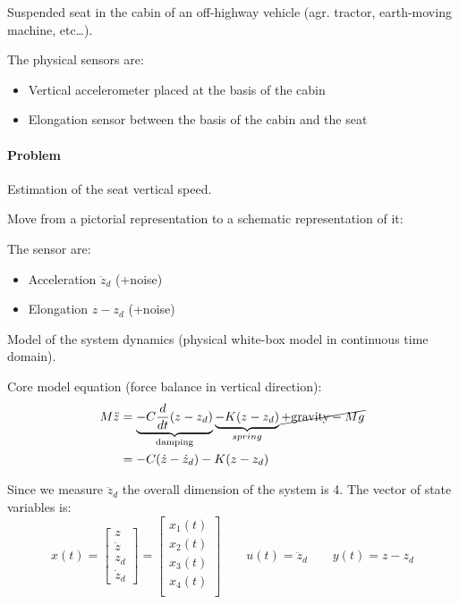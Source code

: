 \begin{exercise}

    Suspended seat in the cabin of an off-highway vehicle (agr. tractor, earth-moving machine, etc\dots).

    The physical sensors are:
    \begin{itemize}
        \item Vertical accelerometer placed at the basis of the cabin
        \item Elongation sensor between the basis of the cabin and the seat
    \end{itemize}

    \paragraph{Problem} Estimation of the seat vertical speed.

    Move from a pictorial representation to a schematic representation of it:

    The sensor are:
    \begin{itemize}
        \item Acceleration $\ddot{z}_d$ (+noise)
        \item Elongation $z-z_d$ (+noise)
    \end{itemize}

    Model of the system dynamics (physical white-box model in continuous time domain).

    Core model equation (force balance in vertical direction):
    \begin{align*}
        M\ddot{z} &= \underbrace{-C\frac{d}{dt}(z-z_d)}_\text{damping} \underbrace{-K(z-z_d)}_{spring} \cancel{+ \text{gravity} - Mg} \\
                  &= -C(\dot{z} - \dot{z}_d) - K(z-z_d)
    \end{align*}

    Since we measure $\ddot{z}_d$ the overall dimension of the system is 4.
    The vector of state variables is:
    \[
        x(t) = \begin{bmatrix}
            z \\
            \dot{z} \\
            z_d \\
            \dot{z}_d
        \end{bmatrix} = \begin{bmatrix}
            x_1(t) \\
            x_2(t) \\
            x_3(t) \\
            x_4(t) \\
        \end{bmatrix}
        \qquad
        u(t) = \ddot{z}_d
        \qquad
        y(t) = z-z_d
    \]


\end{exercise}
